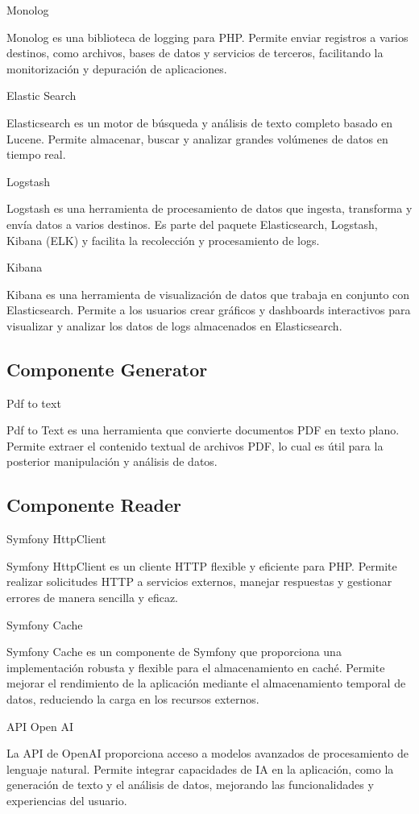 Monolog

Monolog es una biblioteca de logging para PHP. Permite enviar registros a varios destinos, como archivos, bases de datos
y servicios de terceros, facilitando la monitorización y depuración de aplicaciones.

Elastic Search

Elasticsearch es un motor de búsqueda y análisis de texto completo basado en Lucene.
Permite almacenar, buscar y analizar grandes volúmenes de datos en tiempo real.

Logstash

Logstash es una herramienta de procesamiento de datos que ingesta, transforma y envía datos a varios
destinos.
Es parte del paquete Elasticsearch, Logstash, Kibana (ELK) y facilita la recolección y procesamiento de logs.

Kibana

Kibana es una herramienta de visualización de datos que trabaja en conjunto con Elasticsearch.
Permite a los usuarios crear gráficos y dashboards interactivos para visualizar y analizar los datos de logs almacenados
en Elasticsearch.

\subsection{Componente Generator}

Pdf to text

Pdf to Text es una herramienta que convierte documentos PDF en texto plano.
Permite extraer el contenido textual de archivos PDF, lo cual es útil para la posterior manipulación y análisis de
datos.

\subsection{Componente Reader}

Symfony HttpClient

Symfony HttpClient es un cliente HTTP flexible y eficiente para PHP. Permite realizar solicitudes HTTP a servicios
externos, manejar respuestas y gestionar errores de manera sencilla y eficaz.

Symfony Cache

Symfony Cache es un componente de Symfony que proporciona una implementación robusta y flexible para el almacenamiento
en caché.
Permite mejorar el rendimiento de la aplicación mediante el almacenamiento temporal de datos, reduciendo la carga en los
recursos externos.

API Open AI

La API de OpenAI proporciona acceso a modelos avanzados de procesamiento de lenguaje natural.
Permite integrar capacidades de IA en la aplicación, como la generación de texto y el análisis de datos, mejorando las
funcionalidades y experiencias del usuario.
